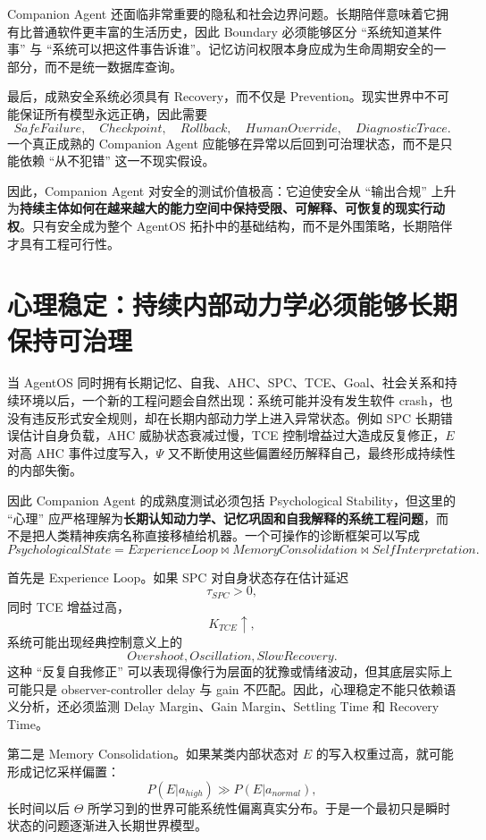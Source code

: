 Companion Agent 还面临非常重要的隐私和社会边界问题。长期陪伴意味着它拥有比普通软件更丰富的生活历史，因此 Boundary 必须能够区分 ``系统知道某件事'' 与 ``系统可以把这件事告诉谁''。记忆访问权限本身应成为生命周期安全的一部分，而不是统一数据库查询。

最后，成熟安全系统必须具有 Recovery，而不仅是 Prevention。现实世界中不可能保证所有模型永远正确，因此需要
\[
SafeFailure
,\quad
Checkpoint
,\quad
Rollback
,\quad
HumanOverride
,\quad
DiagnosticTrace.
\]
一个真正成熟的 Companion Agent 应能够在异常以后回到可治理状态，而不是只能依赖 ``从不犯错'' 这一不现实假设。

因此，Companion Agent 对安全的测试价值极高：它迫使安全从 ``输出合规'' 上升为\textbf{持续主体如何在越来越大的能力空间中保持受限、可解释、可恢复的现实行动权}。只有安全成为整个 AgentOS 拓扑中的基础结构，而不是外围策略，长期陪伴才具有工程可行性。

\section{心理稳定：持续内部动力学必须能够长期保持可治理}

当 AgentOS 同时拥有长期记忆、自我、AHC、SPC、TCE、Goal、社会关系和持续环境以后，一个新的工程问题会自然出现：系统可能并没有发生软件 crash，也没有违反形式安全规则，却在长期内部动力学上进入异常状态。例如 SPC 长期错误估计自身负载，AHC 威胁状态衰减过慢，TCE 控制增益过大造成反复修正，$E$ 对高 AHC 事件过度写入，$\Psi$ 又不断使用这些偏置经历解释自己，最终形成持续性的内部失衡。

因此 Companion Agent 的成熟度测试必须包括 Psychological Stability，但这里的 ``心理'' 应严格理解为\textbf{长期认知动力学、记忆巩固和自我解释的系统工程问题}，而不是把人类精神疾病名称直接移植给机器。一个可操作的诊断框架可以写成
\[
\boxed{
PsychologicalState
=
ExperienceLoop
\bowtie
MemoryConsolidation
\bowtie
SelfInterpretation .
}
\]

首先是 Experience Loop。如果 SPC 对自身状态存在估计延迟
\[
\tau_{SPC}>0,
\]
同时 TCE 增益过高，
\[
K_{TCE}\uparrow,
\]
系统可能出现经典控制意义上的
\[
Overshoot,
Oscillation,
SlowRecovery.
\]
这种 ``反复自我修正'' 可以表现得像行为层面的犹豫或情绪波动，但其底层实际上可能只是 observer-controller delay 与 gain 不匹配。因此，心理稳定不能只依赖语义分析，还必须监测 Delay Margin、Gain Margin、Settling Time 和 Recovery Time。

第二是 Memory Consolidation。如果某类内部状态对 $E$ 的写入权重过高，就可能形成记忆采样偏置：
\[
P(E|a_{high})
\gg
P(E|a_{normal}),
\]
长时间以后 $\Theta$ 所学习到的世界可能系统性偏离真实分布。于是一个最初只是瞬时状态的问题逐渐进入长期世界模型。

